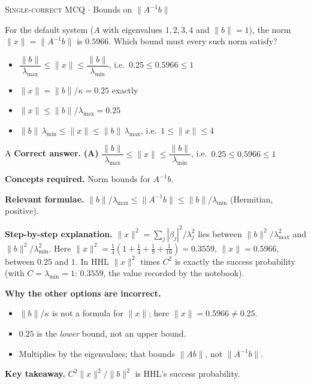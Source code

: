 \documentclass[11pt,a4paper]{article}
\newcommand{\optlabel}[1]{\textbf{(#1)}}
\newcommand{\correctlabel}[1]{\textcolor{okgreen}{\textbf{(#1)}\,\ding{51}}}
\newenvironment{qitem}[1]{\begin{list}{}{\setlength{\leftmargin}{3.3em}\setlength{\labelwidth}{3.1em}%
  \setlength{\labelsep}{0.2em}\setlength{\topsep}{3pt}\setlength{\parsep}{3pt}}\item[\textbf{Q.#1}\hfill]}{\end{list}}
\newcommand{\qsep}{\par\vspace{2pt}{\color{black!15}\hrule}\vspace{4pt}}
\newcommand{\qmeta}[2]{{\footnotesize\color{black!60}\textsc{#1} \;$\cdot$\; #2}\par}
\begin{document}
\begin{qitem}{18}
\qmeta{Single-correct MCQ}{Bounds on $\|A^{-1}b\|$}
For the default system ($A$ with eigenvalues $1, 2, 3, 4$ and $\|b\| = 1$), the norm $\|x\| = \|A^{-1}b\|$ is $0.5966$. Which bound must every such norm satisfy?
\begin{itemize}[leftmargin=2.6em, labelsep=0.4em, itemsep=2pt, topsep=3pt]
\item[\correctlabel{A}] $\dfrac{\|b\|}{\lambda_{\max}} \le \|x\| \le \dfrac{\|b\|}{\lambda_{\min}}$, i.e.\ $0.25 \le 0.5966 \le 1$
\item[\optlabel{B}] $\|x\| = \|b\|/\kappa = 0.25$ exactly
\item[\optlabel{C}] $\|x\| \le \|b\|/\lambda_{\max} = 0.25$
\item[\optlabel{D}] $\|b\|\,\lambda_{\min} \le \|x\| \le \|b\|\,\lambda_{\max}$, i.e.\ $1 \le \|x\| \le 4$
\end{itemize}
\end{qitem}
\begin{solbox}{A}
\textbf{\color{brand}Correct answer.} \textcolor{okgreen}{\textbf{(A)}} $\dfrac{\|b\|}{\lambda_{\max}} \le \|x\| \le \dfrac{\|b\|}{\lambda_{\min}}$, i.e.\ $0.25 \le 0.5966 \le 1$

\textbf{\color{brand}Concepts required.} Norm bounds for $A^{-1}b$.

\textbf{\color{brand}Relevant formulae.} $\|b\|/\lambda_{\max} \le \|A^{-1}b\| \le \|b\|/\lambda_{\min}$ (Hermitian, positive).

\textbf{\color{brand}Step-by-step explanation.} $\|x\|^2 = \sum_j|\beta_j|^2/\lambda_j^2$ lies between $\|b\|^2/\lambda_{\max}^2$ and $\|b\|^2/\lambda_{\min}^2$. Here $\|x\|^2 = \tfrac14(1 + \tfrac14 + \tfrac19 + \tfrac1{16}) = 0.3559$, $\|x\| = 0.5966$,
between $0.25$ and $1$. In HHL $\|x\|^2$ times $C^2$ is exactly the success probability (with $C = \lambda_{\min} = 1$: $0.3559$, the value recorded by the notebook).

\textbf{\color{brand}Why the other options are incorrect.}
\begin{itemize}[leftmargin=2.4em, itemsep=1pt, topsep=2pt]
\item[\textbf{(B)}] $\|b\|/\kappa$ is not a formula for $\|x\|$; here $\|x\| = 0.5966 \ne 0.25$.
\item[\textbf{(C)}] $0.25$ is the \emph{lower} bound, not an upper bound.
\item[\textbf{(D)}] Multiplies by the eigenvalues; that bounds $\|Ab\|$, not $\|A^{-1}b\|$.
\end{itemize}
\textbf{\color{brand}Key takeaway.} $C^2\|x\|^2/\|b\|^2$ is HHL's success probability.
\end{solbox}
\qsep
\end{document}

